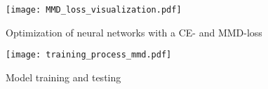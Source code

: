\begin{figure}[H]
  \centering
  \texttt{[image: MMD\_loss\_visualization.pdf]}
  \caption {Optimization of neural networks with a CE- and MMD-loss} \label{fig:MMD_Loss_and_CE_loss}
\end{figure}

\begin{figure}[H]
  \centering
  \texttt{[image: training\_process\_mmd.pdf]}
  \caption {Model training and testing} \label{fig:Training_Process_MMD}
\end{figure}

